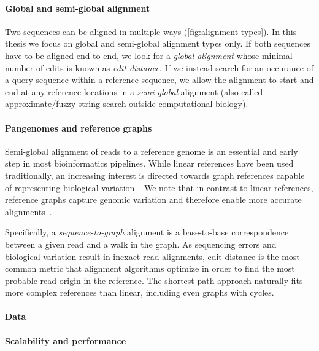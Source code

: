 \paragraph{Global and semi-global alignment}
Two sequences can be aligned in multiple ways (\cref{fig:alignment-types}). In
this thesis we focus on global and semi-global alignment types only. If both
sequences have to be aligned end to end, we look for a \emph{global alignment}
whose minimal number of edits is known as \emph{edit distance}. If we instead
search for an occurance of a query sequence within a reference sequence, we
allow the alignment to start and end at any reference locations in a
\emph{semi-global} alignment (also called approximate/fuzzy string search
outside computational biology).

\paragraph{Pangenomes and reference graphs}

Semi-global alignment of reads to a reference genome is an essential and early
step in most bioinformatics pipelines. While linear references have been used
traditionally, an increasing interest is directed towards graph references
capable of representing biological variation~\citep{garrison_variation_2018}. We
note that in contrast to linear references, reference graphs capture genomic
variation and therefore enable more accurate
alignments~\citep{garrison_variation_2018}.


Specifically, a \emph{sequence-to-graph} alignment is a base-to-base
correspondence between a given read and a walk in the graph. As sequencing
errors and biological variation result in inexact read alignments, edit distance
is the most common metric that alignment algorithms optimize in order to find
the most probable read origin in the reference. The shortest path approach
naturally fits more complex references than linear, including even graphs with
cycles.

\paragraph{Data}


\label{TRIEsec:task}

\paragraph{Scalability and performance}

